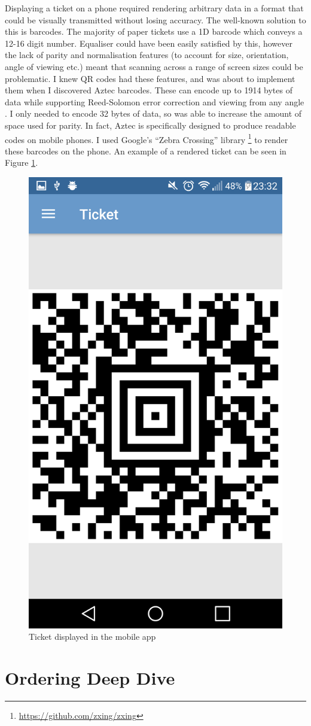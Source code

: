 \documentclass[12pt,a4paper]{bhamdissertation}
\begin{document}
Displaying a ticket on a phone required rendering arbitrary data in a format that could be visually transmitted without losing accuracy. The well-known solution to this is barcodes. The majority of paper tickets use a 1D barcode which conveys a 12-16 digit number. Equaliser could have been easily satisfied by this, however the lack of parity and normalisation features (to account for size, orientation, angle of viewing etc.) meant that scanning across a range of screen sizes could be problematic. I knew QR codes had these features, and was about to implement them when I discovered Aztec barcodes. These can encode up to 1914 bytes of data while supporting Reed-Solomon error correction and viewing from any angle \cite{A14}. I only needed to encode 32 bytes of data, so was able to increase the amount of space used for parity. In fact, Aztec is specifically designed to produce readable codes on mobile phones. I used Google's ``Zebra Crossing'' library \footnote{\url{https://github.com/zxing/zxing}} to render these barcodes on the phone. An example of a rendered ticket can be seen in Figure \ref{fig:ticket}.

\begin{figure}[!htbp]
    \centering
    \includegraphics[width=.5\linewidth]{img/ticket.png}
    \caption{Ticket displayed in the mobile app}
    \label{fig:ticket}
\end{figure}

\section{Ordering Deep Dive}
\end{document}
